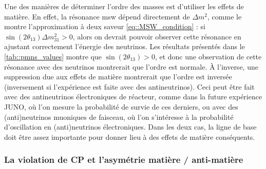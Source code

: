         Une des manières de déterminer l'ordre des masses est d'utiliser les effets de matière. En effet, la résonance \gls{msw} dépend directement de $\Delta m^2$, comme le montre l'approximation à deux saveur \eqref{eq::MSW_condition} : si $\sin(2\theta_{13})\Delta m^2_{31} > 0$, alors on devrait pouvoir observer cette résonance en ajustant correctement l'énergie des neutrinos. Les résultats présentés dans le \autoref{tab::pmns_values} montre que $\sin(2\theta_{13}) > 0$, et donc une observation de cette résonance avec des neutrinos montrerait que l'ordre est normale. À l'inverse, une suppression due aux effets de matière montrerait que l'ordre est inversée (inversement si l'expérience est faite avec des antineutrinos). Ceci peut être fait avec des antineutrinos électroniques de réacteur, comme dans la future expérience JUNO\cite{Yang2015}, où l'on mesure la probabilité de survie de ces derniers, ou avec des (anti)neutrinos muoniques de faisceau, où l'on s'intéresse à la probabilité d'oscillation en (anti)neutrinos électroniques. Dans les deux cas, la ligne de base doit être assez importante pour donner lieu à des effets de matière conséquents.
        

      \subsubsection{La violation de CP et l'asymétrie matière / anti-matière}

